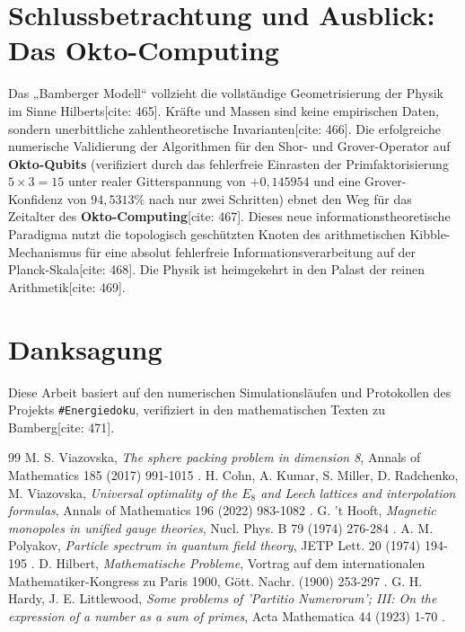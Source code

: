 \documentclass[11pt,a4paper]{article}
\theoremstyle{definition}
\begin{document}
	\section{Schlussbetrachtung und Ausblick: Das Okto-Computing}
	Das „Bamberger Modell“ vollzieht die vollständige Geometrisierung der Physik im Sinne Hilberts[cite: 465]. Kräfte und Massen sind keine empirischen Daten, sondern unerbittliche zahlentheoretische Invarianten[cite: 466]. Die erfolgreiche numerische Validierung der Algorithmen für den Shor- und Grover-Operator auf \textbf{Okto-Qubits} (verifiziert durch das fehlerfreie Einrasten der Primfaktorisierung $5 \times 3 = 15$ unter realer Gitterspannung von $+0{,}145954$ und eine Grover-Konfidenz von $94{,}5313\%$ nach nur zwei Schritten) ebnet den Weg für das Zeitalter des \textbf{Okto-Computing}[cite: 467]. Dieses neue informationstheoretische Paradigma nutzt die topologisch geschützten Knoten des arithmetischen Kibble-Mechanismus für eine absolut fehlerfreie Informationsverarbeitung auf der Planck-Skala[cite: 468]. Die Physik ist heimgekehrt in den Palast der reinen Arithmetik[cite: 469].
	
	\section*{Danksagung}
	Diese Arbeit basiert auf den numerischen Simulationsläufen und Protokollen des Projekts \texttt{\#Energiedoku}, verifiziert in den mathematischen Texten zu Bamberg[cite: 471].
	
	\begin{thebibliography}{99}
		 M. S. Viazovska, \textit{The sphere packing problem in dimension 8}, Annals of Mathematics 185 (2017) 991-1015 \cite{viazovska}.
		 H. Cohn, A. Kumar, S. Miller, D. Radchenko, M. Viazovska, \textit{Universal optimality of the $E_8$ and Leech lattices and interpolation formulas}, Annals of Mathematics 196 (2022) 983-1082 \cite{cohn}.
		 G. 't Hooft, \textit{Magnetic monopoles in unified gauge theories}, Nucl. Phys. B 79 (1974) 276-284 \cite{thooft}.
		 A. M. Polyakov, \textit{Particle spectrum in quantum field theory}, JETP Lett. 20 (1974) 194-195 \cite{polyakov}.
		 D. Hilbert, \textit{Mathematische Probleme}, Vortrag auf dem internationalen Mathematiker-Kongress zu Paris 1900, Gött. Nachr. (1900) 253-297 \cite{hilbert}.
		 G. H. Hardy, J. E. Littlewood, \textit{Some problems of 'Partitio Numerorum'; III: On the expression of a number as a sum of primes}, Acta Mathematica 44 (1923) 1-70 \cite{hardy}.
	\end{thebibliography}
	
\end{document}
